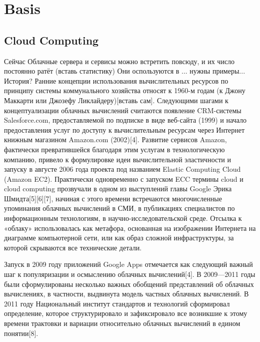 
\chapter{Basis}
\label{chap:basis}

\section{Cloud Computing} \label{sec:cloud}

Сейчас Облачные сервера и сервисы можно встретить повсюду, и их число постоянно ратёт (вставь статистику)
Они оспользуются в ... нужны примеры...
История? 
Ранние концепции использования вычислительных ресурсов по принципу системы коммунального хозяйства относят к 1960-м годам (к Джону Маккарти или Джозефу Ликлайдеру)[вставь сам].
Следующими шагами к концептуализации облачных вычислений считаются появление CRM-системы Salesforce.com, предоставляемой по подписке в виде веб-сайта (1999) и начало предоставления услуг по доступу к вычислительным ресурсам через Интернет книжным магазином Amazon.com (2002)[4]. Развитие сервисов Amazon, фактически превратившейся благодаря этим услугам в технологическую компанию, привело к формулировке идеи вычислительной эластичности и запуску в августе 2006 года проекта под названием Elastic Computing Cloud (Amazon EC2). Практически одновременно с запуском ECC термины cloud и cloud computing прозвучали в одном из выступлений главы Google Эрика Шмидта[5][6][7], начиная с этого времени встречаются многочисленные упоминания облачных вычислений в СМИ, в публикациях специалистов по информационным технологиям, в научно-исследовательской среде. Отсылка к «облаку» использовалась как метафора, основанная на изображении Интернета на диаграмме компьютерной сети, или как образ сложной инфраструктуры, за которой скрываются все технические детали.

Запуск в 2009 году приложений Google Apps отмечается как следующий важный шаг к популяризации и осмыслению облачных вычислений[4]. В 2009—2011 годы были сформулированы несколько важных обобщений представлений об облачных вычислениях, в частности, выдвинута модель частных облачных вычислений. В 2011 году Национальный институт стандартов и технологий сформировал определение, которое структурировало и зафиксировало все возникшие к этому времени трактовки и вариации относительно облачных вычислений в едином понятии[8].

